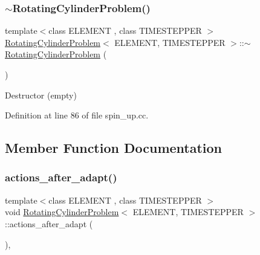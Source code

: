 \mbox{\label{classRotatingCylinderProblem_a586e71f48ee21cfc3bc93d17e91bbc11}} 
\subsubsection{\texorpdfstring{$\sim$\+Rotating\+Cylinder\+Problem()}{~RotatingCylinderProblem()}}
{\footnotesize\ttfamily template$<$class E\+L\+E\+M\+E\+NT , class T\+I\+M\+E\+S\+T\+E\+P\+P\+ER $>$ \\
\hyperlink{classRotatingCylinderProblem}{Rotating\+Cylinder\+Problem}$<$ E\+L\+E\+M\+E\+NT, T\+I\+M\+E\+S\+T\+E\+P\+P\+ER $>$\+::$\sim$\hyperlink{classRotatingCylinderProblem}{Rotating\+Cylinder\+Problem} (\begin{DoxyParamCaption}{ }\end{DoxyParamCaption})\hspace{0.3cm}{\ttfamily [inline]}}



Destructor (empty) 



Definition at line 86 of file spin\+\_\+up.\+cc.



\subsection{Member Function Documentation}
\mbox{\label{classRotatingCylinderProblem_a7d2fc60789ca6e2458be45b94ee40a1c}} 
\subsubsection{\texorpdfstring{actions\+\_\+after\+\_\+adapt()}{actions\_after\_adapt()}}
{\footnotesize\ttfamily template$<$class E\+L\+E\+M\+E\+NT , class T\+I\+M\+E\+S\+T\+E\+P\+P\+ER $>$ \\
void \hyperlink{classRotatingCylinderProblem}{Rotating\+Cylinder\+Problem}$<$ E\+L\+E\+M\+E\+NT, T\+I\+M\+E\+S\+T\+E\+P\+P\+ER $>$\+::actions\+\_\+after\+\_\+adapt (\begin{DoxyParamCaption}{ }\end{DoxyParamCaption})\hspace{0.3cm}{\ttfamily [inline]}, {\ttfamily [private]}}



